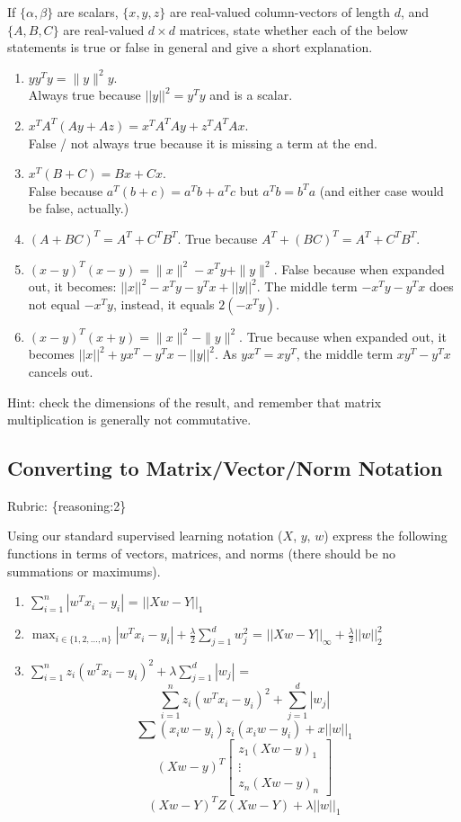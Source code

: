 \documentclass{article}
\def\rubric#1{\gre{Rubric: \{#1\}}}{}
\def\blu#1{{\color{blu}#1}}
\def\gre#1{{\color{gre}#1}}
\def\norm#1{\|#1\|}
\def\enum#1{\begin{enumerate}#1\end{enumerate}}
\begin{document}
If $\{\alpha,\beta\}$ are scalars, $\{x,y,z\}$ are real-valued column-vectors of length $d$,
and $\{A,B,C\}$ are real-valued $d\times d$ matrices, \blu{state whether each of the below statements is true or false in general
and give a short explanation.}
\enum{
\addtocounter{enumi}{6}
\item $yy^Ty = \norm{y}^2y$. \\
Always true because $||y||^2 = y^Ty$ and is a scalar.
\item $x^TA^T(Ay + Az) = x^TA^TAy + z^TA^TAx$. \\
False / not always true because it is missing a term at the end.
\item $x^T(B + C) = Bx + Cx$. \\
False because $a^T(b +c) = a^Tb + a^Tc$ but $a^Tb = b^Ta$ (and either case would be false, actually.)
\item $(A + BC)^T = A^T + C^TB^T$.
True because $A^T + (BC)^T = A^T + C^TB^T$.
\item $(x-y)^T(x-y) = \norm{x}^2 - x^Ty + \norm{y}^2$.
False because when expanded out, it becomes: $||x||^2 - x^Ty - y^Tx + ||y||^2$. The middle term $-x^Ty - y^Tx$ does not equal $-x^Ty$, instead, it equals $2(-x^Ty)$.
\item $(x-y)^T(x+y) = \norm{x}^2 - \norm{y}^2$.
True because when expanded out, it becomes $||x||^2 + yx^T - y^Tx - ||y||^2$. As $yx^T = xy^T$, the middle term $xy^T - y^Tx$ cancels out.
}

Hint: check the dimensions of the result, and remember that matrix multiplication is generally not commutative.

\subsection{Converting to Matrix/Vector/Norm Notation}
\rubric{reasoning:2}

Using our standard supervised learning notation ($X$, $y$, $w$)
express the following functions in terms of vectors, matrices, and norms (there should be no summations or maximums).
{\enum{
\item $\sum_{i=1}^n |w^Tx_i - y_i|$ = 
$||Xw - Y||_1$
\item $\max_{i \in \{1,2,\dots,n\}} |w^Tx_i  - y_i| + \frac{\lambda}{2}\sum_{j=1}^d w_j^2$ =
$||Xw - Y||_\infty + \frac{\lambda}{2}||w||^2_2$
\item $\sum_{i=1}^n z_i (w^Tx_i - y_i)^2 + \lambda \sum_{j=1}^{d} |w_j|$ =
$$\sum_{i=1}^n z_i(w^Tx_i - y_i)^2 + \sum_{j=1}^d|w_j|$$
$$\sum(x_iw - y_i)z_i(x_iw - y_i) + x||w||_1$$
$$(Xw-y)^T\begin{bmatrix} z_1(Xw-y)_1 \\ \vdots \\ z_n(Xw-y)_n \end{bmatrix}$$
$$(Xw - Y)^TZ(Xw - Y) + \lambda||w||_1$$
}}
\end{document}
